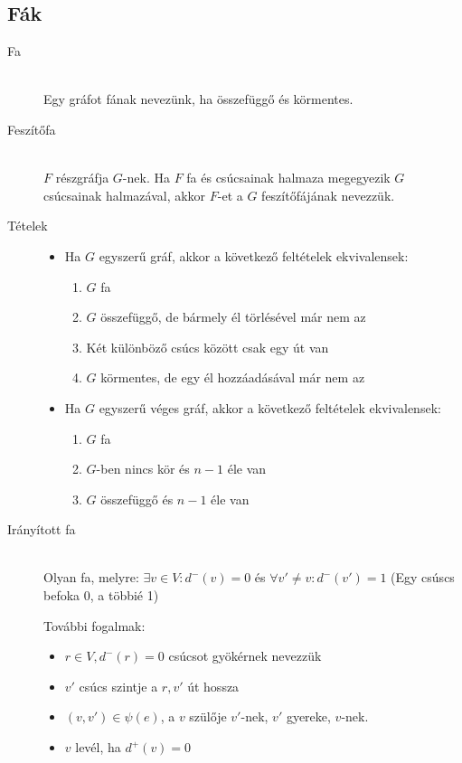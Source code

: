 \documentclass[margin=0px]{article}
\begin{document}
\subsection{Fák}
\begin{description}
    \item[Fa]\hfill \\
    Egy gráfot fának nevezünk, ha összefüggő és körmentes.
    \item[Feszítőfa] \hfill \\
        $F$ részgráfja $G$-nek. Ha $F$ fa és csúcsainak halmaza megegyezik $G$ csúcsainak halmazával, akkor $F$-et a $G$ feszítőfájának nevezzük.
    \item[Tételek] \hfill
        \begin{itemize}
            \item Ha $G$ egyszerű gráf, akkor a következő feltételek ekvivalensek:
                  \begin{enumerate}
                      \item $G$ fa
                      \item $G$ összefüggő, de bármely él törlésével már nem az
                      \item Két különböző csúcs között csak egy út van
                      \item $G$ körmentes, de egy él hozzáadásával már nem az
                  \end{enumerate}
            \item Ha $G$ egyszerű véges gráf, akkor a következő feltételek ekvivalensek:
                  \begin{enumerate}
                      \item $G$ fa
                      \item $G$-ben nincs kör és $n-1$ éle van
                      \item $G$ összefüggő és $n-1$ éle van
                  \end{enumerate}
        \end{itemize}
    \item[Irányított fa] \hfill \\
        Olyan fa, melyre: $\exists v \in V : d^-(v) = 0$ és $\forall v'\neq v : d^-(v') = 1$
        (Egy csúscs befoka 0, a többié 1)

        További fogalmak:
        \begin{itemize}
            \item $r \in V, d^-(r) = 0 $ csúcsot gyökérnek nevezzük
            \item $v'$ csúcs szintje a $r,v'$ út hossza
            \item $(v,v')\in\psi(e)$, a $v$ szülője $v'$-nek, $v'$ gyereke, $v$-nek.
            \item $v$ levél, ha $d^+(v)=0$
        \end{itemize}
\end{description}
\end{document}
